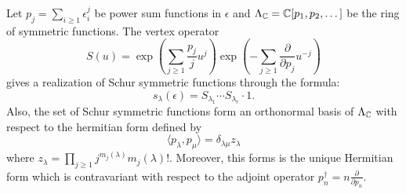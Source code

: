 \begin{dang}
    \begin{theorem}\label{Theorem: boson fermion correspondence final version}
        Let $p_j = \sum_{i\geq1}\epsilon_i^j$ be power sum functions in $\epsilon$ and $\Lambda_{\mathbb{C}}=\mathbb{C}[p_1,p_2,\dots]$ be the ring of symmetric functions. The vertex operator 
        \begin{equation}
              S(u) = \exp\left(\sum_{j\geq1}\frac{p_j}j{}u^j\right)\exp\left(-\sum_{j\geq1}\frac{\partial}{\partial p_j}u^{-j}\right)
        \end{equation}
        gives a realization of Schur symmetric functions through the formula:
        \begin{equation}
            s_\lambda(\epsilon) = S_{\lambda_1}\cdots S_{\lambda_r}\cdot 1.
        \end{equation}
        Also, the set of Schur symmetric functions form an orthonormal basis of $\Lambda_{\mathbb{C}}$ with respect to the hermitian form defined by
        \begin{equation}
            \langle p_\lambda,p_\mu\rangle = \delta_{\lambda\mu}z_\lambda
        \end{equation}
        where $z_\lambda = \prod_{j\geq1}j^{m_j(\lambda)}m_j(\lambda)!$. Moreover, this forms is the unique Hermitian form which is contravariant with respect to the adjoint operator $p_n^\dagger = n\frac{\partial}{\partial p_n}$.
    \end{theorem}
\end{dang}
